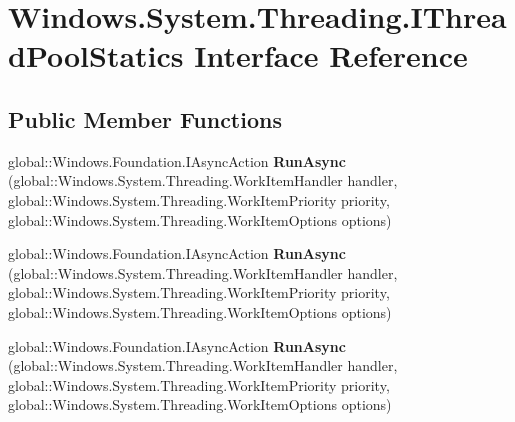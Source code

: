 \hypertarget{interface_windows_1_1_system_1_1_threading_1_1_i_thread_pool_statics}{}\section{Windows.\+System.\+Threading.\+I\+Thread\+Pool\+Statics Interface Reference}
\label{interface_windows_1_1_system_1_1_threading_1_1_i_thread_pool_statics}
\subsection*{Public Member Functions}
\begin{DoxyCompactItemize}
\item 
\mbox{\label{interface_windows_1_1_system_1_1_threading_1_1_i_thread_pool_statics_a1bc85955e9e8d602de11e40d41580e6b}} 
global\+::\+Windows.\+Foundation.\+I\+Async\+Action {\bfseries Run\+Async} (global\+::\+Windows.\+System.\+Threading.\+Work\+Item\+Handler handler, global\+::\+Windows.\+System.\+Threading.\+Work\+Item\+Priority priority, global\+::\+Windows.\+System.\+Threading.\+Work\+Item\+Options options)
\item 
\mbox{\label{interface_windows_1_1_system_1_1_threading_1_1_i_thread_pool_statics_a1bc85955e9e8d602de11e40d41580e6b}} 
global\+::\+Windows.\+Foundation.\+I\+Async\+Action {\bfseries Run\+Async} (global\+::\+Windows.\+System.\+Threading.\+Work\+Item\+Handler handler, global\+::\+Windows.\+System.\+Threading.\+Work\+Item\+Priority priority, global\+::\+Windows.\+System.\+Threading.\+Work\+Item\+Options options)
\item 
\mbox{\label{interface_windows_1_1_system_1_1_threading_1_1_i_thread_pool_statics_a1bc85955e9e8d602de11e40d41580e6b}} 
global\+::\+Windows.\+Foundation.\+I\+Async\+Action {\bfseries Run\+Async} (global\+::\+Windows.\+System.\+Threading.\+Work\+Item\+Handler handler, global\+::\+Windows.\+System.\+Threading.\+Work\+Item\+Priority priority, global\+::\+Windows.\+System.\+Threading.\+Work\+Item\+Options options)
\item 
\mbox{\label{interface_windows_1_1_system_1_1_threading_1_1_i_thread_pool_statics_a1bc85955e9e8d602de11e40d41580e6b}} 

\end{DoxyCompactItemize}
